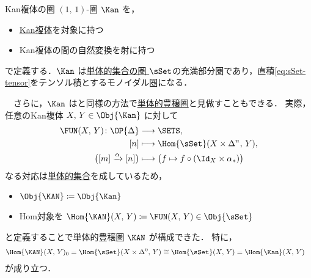 \documentclass[TQFT_main]{subfiles}
\begin{document}
\begin{myexample}[label=def:Kan]{Kan複体の圏}
    $(1,\, 1)$-圏 $\Kan$ を，
    \begin{itemize}
        \item \hyperref[def:KanCplx]{Kan複体}を対象に持つ
        \item Kan複体の間の自然変換を射に持つ
    \end{itemize}
    で定義する．$\Kan$ は\hyperref[def:SimpSet]{単体的集合の圏 $\sSet$}の充満部分圏であり，直積\eqref{eq:sSet-tensor}をテンソル積とするモノイダル圏になる．

    　さらに，$\Kan$ はと同様の方法で\hyperref[def:SimpCat]{単体的豊穣圏}と見做すこともできる．
    実際，任意のKan複体 $X,\, Y \in \Obj{\Kan}$ に対して
    \begin{align}
        \FUN(X,\, Y) \colon \OP{\Delta} &\lto \SETS, \\
        [n] &\lmto \Hom{\sSet}(X \times \Delta^n,\, Y), \\
        \bigl( [m] \xrightarrow{\alpha} [n] \bigr) &\lmto \bigl( f \mapsto f \circ (\Id_X \times \alpha_*) \bigr) 
    \end{align}
    なる対応は\hyperref[def:SimpSet]{単体的集合}を成しているため，
    \begin{itemize}
        \item $\Obj{\KAN} \coloneqq \Obj{\Kan}$ 
        \item Hom対象を $\Hom{\KAN}(X,\, Y) \coloneqq \FUN(X,\, Y) \in \Obj{\sSet}$
    \end{itemize}
    と定義することで単体的豊穣圏 $\KAN$ が構成できた．
    特に，
    \begin{align}
        \Hom{\KAN}(X,\, Y)_0 &= \Hom{\sSet}(X \times \Delta^0,\, Y) \cong \Hom{\sSet}(X,\, Y) = \Hom{\Kan}(X,\, Y)
    \end{align}
    が成り立つ．
\end{myexample}
\end{document}
